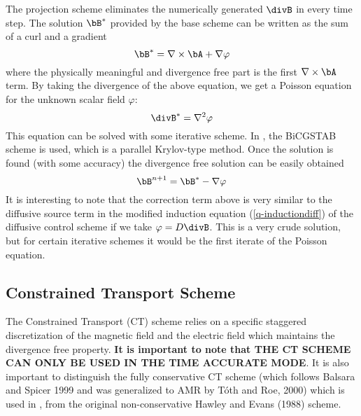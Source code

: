 The projection scheme eliminates the numerically generated $\divB$ in
every time step. The solution $\bB^*$ provided by the base scheme can
be written as the sum of a curl and a gradient
\begin{equation}
  \bB^*=\nabla\times\bA+\nabla\varphi         \label{q-curlplusgrad}
\end{equation}
where the physically meaningful and divergence free part is the first
$\nabla\times\bA$ term. By taking the divergence of the above equation,
we get a Poisson equation for the unknown scalar field $\varphi$:
\begin{equation}
  \divB^{*}=\nabla^2 \varphi                  \label{q-Poisson}
\end{equation}
This equation can be solved with some iterative scheme. In \BATSRUS, the
BiCGSTAB scheme is used, which is a parallel Krylov-type method.
Once the solution is found (with some accuracy) the divergence free solution
can be easily obtained
\begin{equation}
  \bB^{n+1}=\bB^*-\nabla\varphi                \label{q-correction}
\end{equation}
It is interesting to note that the correction term above is very similar
to the diffusive source term in the modified induction equation 
(\ref{q-inductiondiff}) of the diffusive control scheme if we take 
$\varphi=D \divB$. This is a very crude solution, but  
for certain iterative schemes it would be the first iterate
of the Poisson equation.

\subsection{Constrained Transport Scheme \label{section:CT}}

The Constrained Transport (CT) scheme relies on a specific staggered 
discretization of the magnetic field and the electric field which maintains 
the divergence free property. {\bf It is important to note that 
THE CT SCHEME CAN ONLY BE USED IN THE TIME ACCURATE MODE}. 
It is also important to distinguish the fully conservative 
CT scheme (which follows Balsara and Spicer 1999 and was generalized to AMR by 
T\'oth and Roe, 2000) which is used in \BATSRUS, 
from the original non-conservative Hawley and Evans (1988) scheme.

